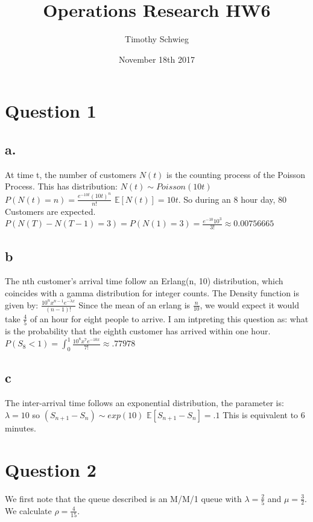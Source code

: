 \documentclass[10pt, letterpaper]{paper}
\title{ Operations Research HW6 }
\author{ Timothy Schwieg }
\date{ November 18th 2017 }
\begin{document}
\maketitle

\section*{Question 1 }

\subsection*{a.}
At time t, the number of customers $N(t)$ is the counting process of the Poisson Process. This has distribution: $N(t) \sim Poisson( 10t )$
\newline
$P( N(t) = n ) = \frac{ e^{-10t} (10t)^n } { n!}$
\newline
$\mathbb{E}[N(t)] = 10t$. So during an 8 hour day, 80 Customers are expected.
\newline
$P( N(T) - N(T-1) = 3 ) = P( N(1) = 3 ) = \frac{ e^{-10} 10^3 }{ 3!} \approx 0.00756665$

\subsection*{b}
The nth customer's arrival time follow an Erlang(n, 10) distribution, which coincides with a gamma distribution for integer counts.
\newline
The Density function is given by: $\frac{ 10^n x^{n-1} e^{ - \lambda x }}{ (n-1)!}$
\newline
Since the mean of an erlang is $\frac{ n }{10}$, we would expect it would take $\frac{4}{5}$ of an hour for eight people to arrive.
\newline
I am intpreting this question as: what is the probability that the eighth customer has arrived within one hour.
$P( S_8 < 1 ) = \int_0^1 \frac{ 10^8 x^{7} e^{-10x}}{7!} \approx .77978$

\subsection*{c}
The inter-arrival time follows an exponential distribution, the parameter is: $\lambda = 10$ so $(S_{n+1} - S_n) \sim exp( 10 )$
\newline
$\mathbb{E}[S_{n+1} -S_n] = .1$  This is equivalent to 6 minutes. 



\section*{Question 2}
We first note that the queue described is an M/M/1 queue with $\lambda = \frac{2}{5}$ and $\mu = \frac{ 3}{2}$. We calculate $\rho = \frac{4}{15}$.
\end{document}
